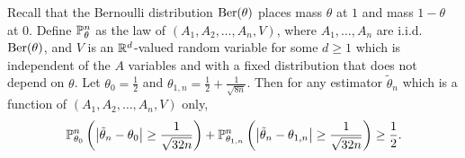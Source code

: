 \begin{lemma}
  \label{lem:neyman_pearson_bernoulli}

  Recall that the Bernoulli distribution
  $\Ber(\theta)$
  places mass $\theta$ at $1$ and mass
  $1-\theta$ at $0$.
  Define $\P_\theta^n$ as the law of
  $(A_1, A_2, \ldots, A_n, V)$,
  where $A_1, \ldots, A_n$
  are i.i.d.\ $\Ber(\theta)$,
  and $V$ is an $\R^d$-valued random variable
  for some $d \geq 1$
  which is independent of the $A$ variables
  and with a fixed distribution that does not depend on $\theta$.
  Let $\theta_0 = \frac{1}{2}$
  and $\theta_{1,n} = \frac{1}{2} + \frac{1}{\sqrt{8n}}$.
  Then for any estimator $\tilde \theta_n$
  which is a function of
  $(A_1, A_2, \ldots, A_n, V)$ only,
  \begin{align*}
    \P_{\theta_0}^n \left(
      \big| \tilde \theta_n - \theta_0 \big|
      \geq \frac{1}{\sqrt{32n}}
    \right)
    + \P_{\theta_{1,n}}^n \left(
      \big| \tilde \theta_n - \theta_{1,n} \big|
      \geq \frac{1}{\sqrt{32n}}
    \right)
    \geq \frac{1}{2}.
  \end{align*}

\end{lemma}

